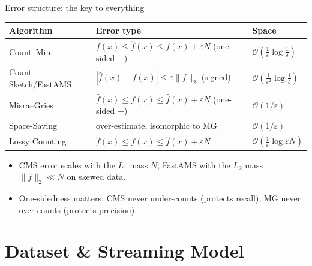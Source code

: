 \documentclass[11pt,aspectratio=169]{beamer}
\newcommand{\bigO}[1]{\mathcal{O}\!\left(#1\right)}
\begin{document}
\begin{frame}{Error structure: the key to everything}
  \centering
  \renewcommand{\arraystretch}{1.3}
  \begin{tabular}{lll}
    \toprule
    \textbf{Algorithm} & \textbf{Error type} & \textbf{Space} \\
    \midrule
    Count--Min           & $f(x)\le \hat f(x)\le f(x)+\varepsilon N$ (one-sided $+$) & $\bigO{\tfrac{1}{\varepsilon}\log\tfrac1\delta}$ \\
    Count Sketch/FastAMS & $|\hat f(x)-f(x)|\le \varepsilon\lVert f\rVert_2$ (signed) & $\bigO{\tfrac{1}{\varepsilon^2}\log\tfrac1\delta}$ \\
    Misra--Gries         & $\hat f(x)\le f(x)\le \hat f(x)+\varepsilon N$ (one-sided $-$) & $\bigO{1/\varepsilon}$ \\
    Space-Saving         & over-estimate, isomorphic to MG & $\bigO{1/\varepsilon}$ \\
    Lossy Counting       & $\hat f(x)\le f(x)\le \hat f(x)+\varepsilon N$ & $\bigO{\tfrac1\varepsilon\log \varepsilon N}$ \\
    \bottomrule
  \end{tabular}

  \vspace{0.8em}
  \begin{itemize}
    \item CMS error scales with the $L_1$ mass $N$; FastAMS with the $L_2$ mass
          $\lVert f\rVert_2 \ll N$ on skewed data.
    \item \alert{One-sidedness matters:} CMS never under-counts (protects recall),
          MG never over-counts (protects precision).
  \end{itemize}
\end{frame}

\section{Dataset \& Streaming Model}
\end{document}
